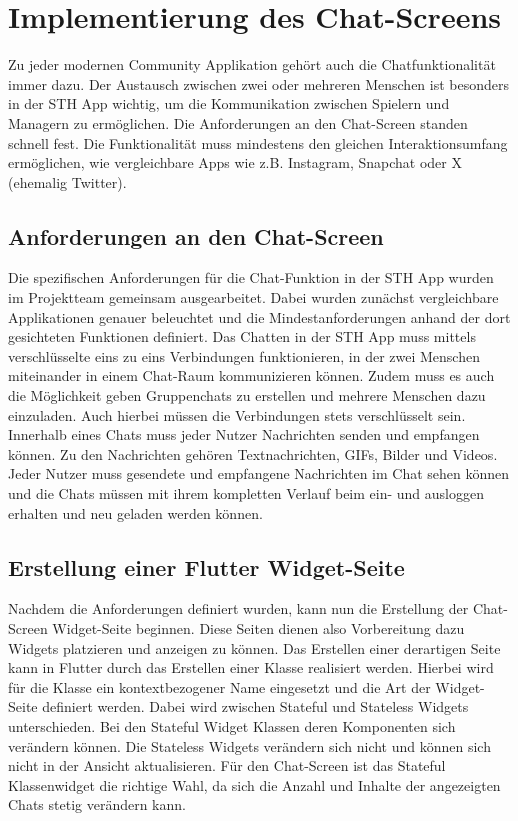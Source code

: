 \chapter{Implementierung des Chat-Screens}
Zu jeder modernen Community Applikation gehört auch die Chatfunktionalität immer dazu. Der Austausch zwischen zwei oder mehreren Menschen ist besonders in der STH App wichtig, um die Kommunikation zwischen Spielern und Managern zu ermöglichen. Die Anforderungen an den Chat-Screen standen schnell fest. Die Funktionalität muss mindestens den gleichen Interaktionsumfang ermöglichen, wie vergleichbare Apps wie z.B. Instagram, Snapchat oder X (ehemalig Twitter).

\section{Anforderungen an den Chat-Screen}
Die spezifischen Anforderungen für die Chat-Funktion in der STH App wurden im Projektteam gemeinsam ausgearbeitet. Dabei wurden zunächst vergleichbare Applikationen genauer beleuchtet und die Mindestanforderungen anhand der dort gesichteten Funktionen definiert. Das Chatten in der STH App muss mittels verschlüsselte eins zu eins Verbindungen funktionieren, in der zwei Menschen miteinander in einem Chat-Raum kommunizieren können. Zudem muss es auch die Möglichkeit geben Gruppenchats zu erstellen und mehrere Menschen dazu einzuladen. Auch hierbei müssen die Verbindungen stets verschlüsselt sein. Innerhalb eines Chats muss jeder Nutzer Nachrichten senden und empfangen können. Zu den Nachrichten gehören Textnachrichten, GIFs, Bilder und Videos. Jeder Nutzer muss gesendete und empfangene Nachrichten im Chat sehen können und die Chats müssen mit ihrem kompletten Verlauf beim ein- und ausloggen erhalten und neu geladen werden können.

\section{Erstellung einer Flutter Widget-Seite}
Nachdem die Anforderungen definiert wurden, kann nun die Erstellung der Chat-Screen Widget-Seite beginnen. Diese Seiten dienen also Vorbereitung dazu Widgets platzieren und anzeigen zu können. Das Erstellen einer derartigen Seite kann in Flutter durch das Erstellen einer Klasse realisiert werden. Hierbei wird für die Klasse ein kontextbezogener Name eingesetzt und die Art der Widget-Seite definiert werden. Dabei wird zwischen Stateful und Stateless Widgets unterschieden. Bei den Stateful Widget Klassen deren Komponenten sich verändern können. Die Stateless Widgets verändern sich nicht und können sich nicht in der Ansicht aktualisieren. Für den Chat-Screen ist das Stateful Klassenwidget die richtige Wahl, da sich die Anzahl und Inhalte der angezeigten Chats stetig verändern kann.

